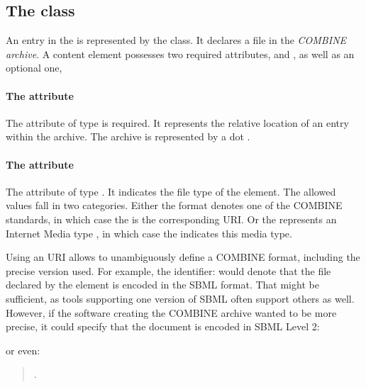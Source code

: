 \subsection{The  class}
\label{content-class}
An entry in the \OmexManifest is represented by the \Content class. It declares a file in the \emph{COMBINE archive}. A content element possesses two required attributes,  and , as well as an optional one,  

\paragraph{The  attribute}
The  attribute of type 
 is required. It represents the relative location of an entry within the 
archive. The archive is represented by a dot . 

\paragraph{The  attribute}
The  attribute of type . It 
indicates the file type of the \Content element. The allowed values fall in two categories. Either the format 
denotes one of the COMBINE standards, in which case the  
is the corresponding  URI. Or the 
 represents an Internet Media type \citep{rfc2046}, in which case the  
indicates this media type.

Using an  URI allows to unambiguously define a COMBINE format, including the precise version used. For example, the identifier:  would denote that the file declared by the \Content 
element is encoded in the SBML format. That might be sufficient, as tools supporting one version of SBML often
support others as well. However, if the software creating the COMBINE archive wanted to be more precise, it could specify that the document is encoded in SBML Level 2: 

\begin{quote}
\end{quote}

or even:

\begin{quote}
.
\end{quote}


